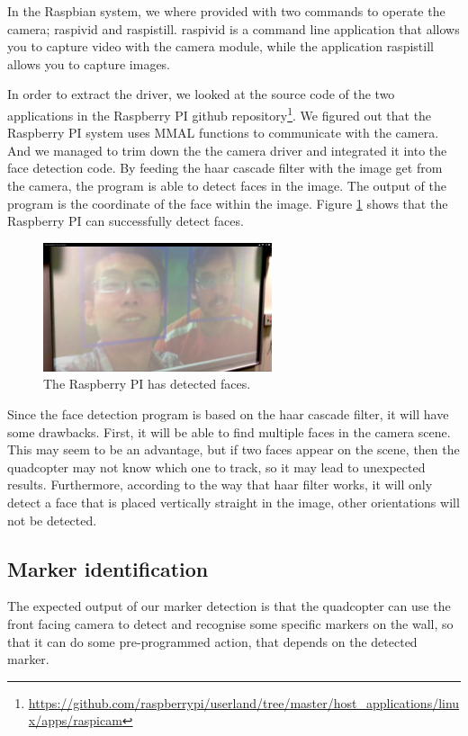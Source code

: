 \documentclass[11pt, a4paper, onecolumn, oneside, parskip=half]{scrartcl}
\begin{document}
In the Raspbian system, we where provided with two commands to operate the camera; raspivid and raspistill. raspivid is a command line application that allows you to capture video with the camera module, while the application raspistill allows you to capture images.

In order to extract the driver, we looked at the source code of the two applications in the Raspberry PI github repository\footnote{\url{https://github.com/raspberrypi/userland/tree/master/host_applications/linux/apps/raspicam}}. We figured out that the Raspberry PI system uses MMAL functions to communicate with the camera. And we managed to trim down the the camera driver and integrated it into the face detection code. By feeding the haar cascade filter with the image get from the camera, the program is able to detect faces in the image. The output of the program is the coordinate of the face within the image. Figure \ref{fig:raspifaces} shows that the Raspberry PI can successfully detect faces.

\begin{figure}[ht]
\centering
\includegraphics[width=0.6\textwidth]{image02}
\caption{The Raspberry PI has detected faces.}
\label{fig:raspifaces}
\end{figure}

Since the face detection program is based on the haar cascade filter, it will have some drawbacks. First, it will be able to find multiple faces in the camera scene. This may seem to be an advantage, but if two faces appear on the scene, then the quadcopter may not know which one to track, so it may lead to unexpected results. Furthermore, according to the way that haar filter works, it will only detect a face that is placed vertically straight in the image, other orientations will not be detected.

\subsection{Marker identification}
\label{sec:objectives:marker}
The expected output of our marker detection is that the quadcopter can use the front facing camera to detect and recognise some specific markers on the wall, so that it can do some pre-programmed action, that depends on the detected marker. 
\end{document}
